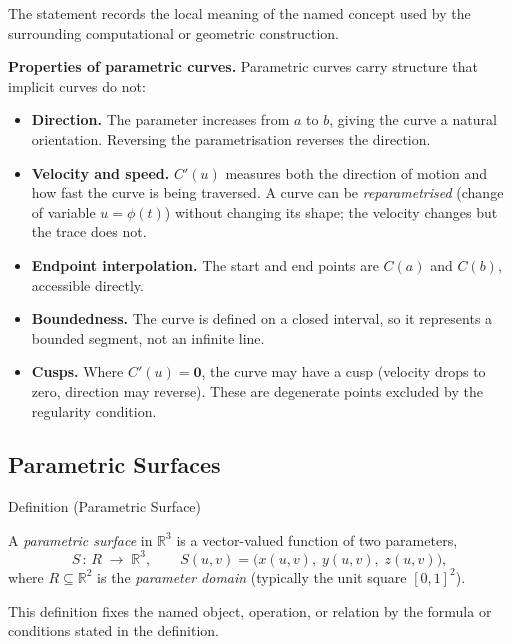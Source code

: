 \begin{remark*}[Interpretation]
The statement records the local meaning of the named concept used by the
surrounding computational or geometric construction.
\end{remark*}

\DefinitionalRoot

\begin{remark*}[Exposition]
\textbf{Properties of parametric curves.}
Parametric curves carry structure that implicit curves do not:
\begin{itemize}
  \item \textbf{Direction.}
        The parameter increases from $a$ to $b$, giving the curve
        a natural orientation.
        Reversing the parametrisation reverses the direction.
  \item \textbf{Velocity and speed.}
        $C'(u)$ measures both the direction of motion and how fast
        the curve is being traversed.
        A curve can be \emph{reparametrised} (change of variable
        $u = \phi(t)$) without changing its shape;
        the velocity changes but the trace does not.
  \item \textbf{Endpoint interpolation.}
        The start and end points are $C(a)$ and $C(b)$, accessible directly.
  \item \textbf{Boundedness.}
        The curve is defined on a closed interval, so it represents
        a bounded segment, not an infinite line.
  \item \textbf{Cusps.}
        Where $C'(u) = \mathbf{0}$, the curve may have a cusp
        (velocity drops to zero, direction may reverse).
        These are degenerate points excluded by the regularity condition.
\end{itemize}
\end{remark*}

\subsection*{Parametric Surfaces}

\begin{definitionbox}{Definition (Parametric Surface)}
\begin{definition}
\label{def:parametric-surface}
A \emph{parametric surface} in $\mathbb{R}^3$ is a vector-valued function
of two parameters,
\[
  S\,:\,R\;\longrightarrow\;\mathbb{R}^3, \qquad
  S(u,v) = \bigl(x(u,v),\;y(u,v),\;z(u,v)\bigr),
\]
where $R\subseteq\mathbb{R}^2$ is the \emph{parameter domain}
(typically the unit square $[0,1]^2$).
\end{definition}
\end{definitionbox}
\begin{remark*}
This definition fixes the named object, operation, or relation by the formula
or conditions stated in the definition.
\end{remark*}

